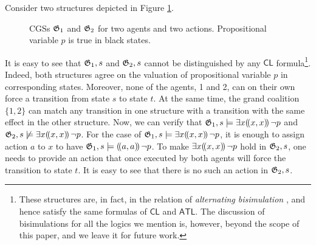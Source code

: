 \documentclass{article}
\begin{document}
Consider two structures depicted in Figure \ref{fig::exampleCGM}. 
\begin{figure}[h!]
\centering
{}
\caption{CGSs $\mathfrak{G}_1$ and $\mathfrak{G}_2$ for two agents and two actions. Propositional variable $p$ is true in black states.}
\label{fig::exampleCGM}
\end{figure} 
It is easy to see that $\mathfrak{G}_1,s$ and $\mathfrak{G}_2,s$ cannot be distinguished by any $\mathsf{CL}$ formula\footnote{These structures are, in fact, in the relation of \textit{alternating bisimulation} \cite{agotnes07}, and hence satisfy the same formulas of $\mathsf{CL}$ and $\mathsf{ATL}$. The discussion of bisimulations for all the logics we mention is, however, beyond the scope of this paper, and we leave it for future work.}. Indeed, both structures agree on the valuation of propositional variable $p$ in corresponding states. Moreover, none of the agents, 1 and 2, can on their own force a transition from state $s$ to state $t$. At the same time, the grand coalition $\{1,2\}$ can match any transition in one structure with a transition with the same effect in the other structure. %
Now, we can verify that $\mathfrak{G}_1,s \models \exists x (\!( x, x )\!)\, \lnot p$ and $\mathfrak{G}_2,s \not \models \exists x (\!( x, x )\!)\, \lnot p$. For the case of  $\mathfrak{G}_1,s \models \exists x (\!( x, x )\!)\, \lnot p$, it is enough to assign action $a$ to $x$ to have $\mathfrak{G}_1,s \models (\!( a, a )\!)\, \lnot p$. To make $\exists x (\!( x, x )\!)\, \lnot p$ hold in $\mathfrak{G}_2, s$, one needs to provide an action that once executed by both agents will force the transition to state $t$. It is easy to see that there is no such an action in $\mathfrak{G}_2,s$.
\end{document}
